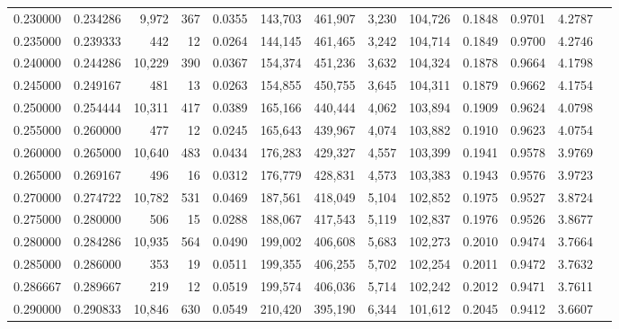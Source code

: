 \begin{tabular}{rrrrrrrrrrrrr}
0.230000 & 0.234286 &  9,972 &   367 &                                     0.0355 & 143,703 & 461,907 &   3,230 & 104,726 & 0.1848 & 0.9701 & 4.2787 \\
0.235000 & 0.239333 &    442 &    12 &                                     0.0264 & 144,145 & 461,465 &   3,242 & 104,714 & 0.1849 & 0.9700 & 4.2746 \\
0.240000 & 0.244286 & 10,229 &   390 &                                     0.0367 & 154,374 & 451,236 &   3,632 & 104,324 & 0.1878 & 0.9664 & 4.1798 \\
0.245000 & 0.249167 &    481 &    13 &                                     0.0263 & 154,855 & 450,755 &   3,645 & 104,311 & 0.1879 & 0.9662 & 4.1754 \\
0.250000 & 0.254444 & 10,311 &   417 &                                     0.0389 & 165,166 & 440,444 &   4,062 & 103,894 & 0.1909 & 0.9624 & 4.0798 \\
0.255000 & 0.260000 &    477 &    12 &                                     0.0245 & 165,643 & 439,967 &   4,074 & 103,882 & 0.1910 & 0.9623 & 4.0754 \\
0.260000 & 0.265000 & 10,640 &   483 &                                     0.0434 & 176,283 & 429,327 &   4,557 & 103,399 & 0.1941 & 0.9578 & 3.9769 \\
0.265000 & 0.269167 &    496 &    16 &                                     0.0312 & 176,779 & 428,831 &   4,573 & 103,383 & 0.1943 & 0.9576 & 3.9723 \\
0.270000 & 0.274722 & 10,782 &   531 &                                     0.0469 & 187,561 & 418,049 &   5,104 & 102,852 & 0.1975 & 0.9527 & 3.8724 \\
0.275000 & 0.280000 &    506 &    15 &                                     0.0288 & 188,067 & 417,543 &   5,119 & 102,837 & 0.1976 & 0.9526 & 3.8677 \\
0.280000 & 0.284286 & 10,935 &   564 &                                     0.0490 & 199,002 & 406,608 &   5,683 & 102,273 & 0.2010 & 0.9474 & 3.7664 \\
0.285000 & 0.286000 &    353 &    19 &                                     0.0511 & 199,355 & 406,255 &   5,702 & 102,254 & 0.2011 & 0.9472 & 3.7632 \\
0.286667 & 0.289667 &    219 &    12 &                                     0.0519 & 199,574 & 406,036 &   5,714 & 102,242 & 0.2012 & 0.9471 & 3.7611 \\
0.290000 & 0.290833 & 10,846 &   630 &                                     0.0549 & 210,420 & 395,190 &   6,344 & 101,612 & 0.2045 & 0.9412 & 3.6607 \\

\end{tabular}
